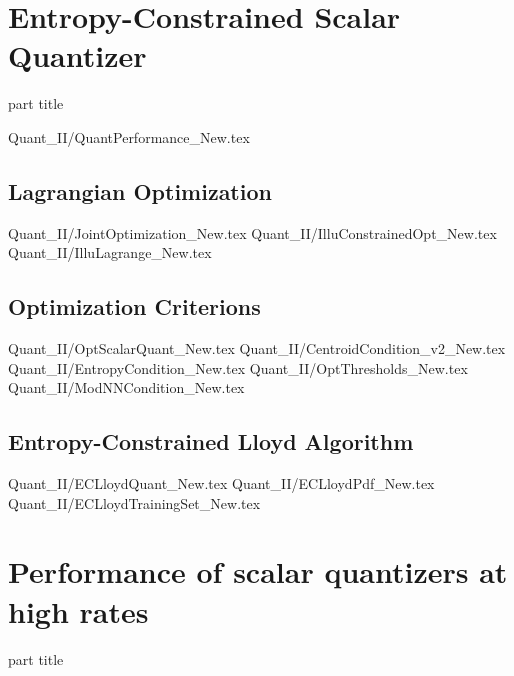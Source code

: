 \section{Entropy-Constrained Scalar Quantizer}
\begin{frame}
 \vspace{12.0ex}
\begin{center}
\begin{beamercolorbox}[sep=12pt,center]{part title}
\insertsection\par
\end{beamercolorbox}
\end{center}
\end{frame}

                   {Quant_II/QuantPerformance_New.tex}
  \subsection{Lagrangian Optimization}
                    {Quant_II/JointOptimization_New.tex}
                    {Quant_II/IlluConstrainedOpt_New.tex}
                    {Quant_II/IlluLagrange_New.tex}

  \subsection{Optimization Criterions}
                   {Quant_II/OptScalarQuant_New.tex}
                    {Quant_II/CentroidCondition_v2_New.tex}
                    {Quant_II/EntropyCondition_New.tex}
                    {Quant_II/OptThresholds_New.tex}
                    {Quant_II/ModNNCondition_New.tex}
      
  \subsection{Entropy-Constrained Lloyd Algorithm}
   {Quant_II/ECLloydQuant_New.tex}
   {Quant_II/ECLloydPdf_New.tex}
   {Quant_II/ECLloydTrainingSet_New.tex}



%
%


\section{Performance of scalar quantizers at high rates}
\begin{frame}
 \vspace{12.0ex}
\begin{center}
\begin{beamercolorbox}[sep=12pt,center]{part title}
\insertsection\par
\end{beamercolorbox}
\end{center}
\end{frame}

